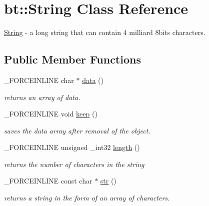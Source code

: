 \hypertarget{classbt_1_1_string}{\section{bt\-:\-:String Class Reference}
\label{classbt_1_1_string}
}


\hyperlink{classbt_1_1_string}{String} -\/ a long string that can contain 4 milliard 8bits characters.  


\subsection*{Public Member Functions}
\begin{DoxyCompactItemize}
\item 
\hypertarget{classbt_1_1_string_a3047648ac1170756ed8eecc60094db8a}{\-\_\-\-F\-O\-R\-C\-E\-I\-N\-L\-I\-N\-E char $\ast$ \hyperlink{classbt_1_1_string_a3047648ac1170756ed8eecc60094db8a}{data} ()}\label{classbt_1_1_string_a3047648ac1170756ed8eecc60094db8a}

\begin{DoxyCompactList}\small\item\em returns an array of data. \end{DoxyCompactList}\item 
\hypertarget{classbt_1_1_string_ac2b7405c2a450d5a492b1dca76a8743a}{\-\_\-\-F\-O\-R\-C\-E\-I\-N\-L\-I\-N\-E void \hyperlink{classbt_1_1_string_ac2b7405c2a450d5a492b1dca76a8743a}{keep} ()}\label{classbt_1_1_string_ac2b7405c2a450d5a492b1dca76a8743a}

\begin{DoxyCompactList}\small\item\em saves the data array after removal of the object. \end{DoxyCompactList}\item 
\hypertarget{classbt_1_1_string_abbd4c037362f0630e1ba50e383b9eb93}{\-\_\-\-F\-O\-R\-C\-E\-I\-N\-L\-I\-N\-E unsigned \-\_\-int32 \hyperlink{classbt_1_1_string_abbd4c037362f0630e1ba50e383b9eb93}{length} ()}\label{classbt_1_1_string_abbd4c037362f0630e1ba50e383b9eb93}

\begin{DoxyCompactList}\small\item\em returns the number of characters in the string \end{DoxyCompactList}\item 
\hypertarget{classbt_1_1_string_abf24a469879d4e4e1f3d8eaf0c1ab7d2}{\-\_\-\-F\-O\-R\-C\-E\-I\-N\-L\-I\-N\-E const char $\ast$ \hyperlink{classbt_1_1_string_abf24a469879d4e4e1f3d8eaf0c1ab7d2}{str} ()}\label{classbt_1_1_string_abf24a469879d4e4e1f3d8eaf0c1ab7d2}

\begin{DoxyCompactList}\small\item\em returns a string in the form of an array of characters. \end{DoxyCompactList}\end{DoxyCompactItemize}


